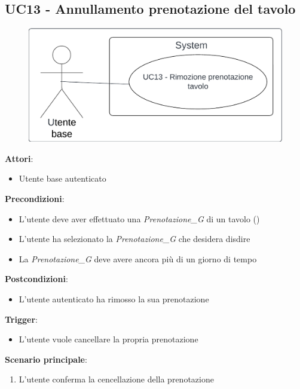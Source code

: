 \subsection{UC13 - Annullamento prenotazione del tavolo} \label{usecase:13}
\begin{figure}[H]
\centering
\includegraphics[width=0.75\linewidth]{ucd/ucd13.png}
\end{figure}
\textbf{Attori}:
\begin{itemize}
    \item Utente base autenticato
\end{itemize}
\textbf{Precondizioni}:
\begin{itemize}
    \item L'utente deve aver effettuato una \textit{Prenotazione_G} di un tavolo ()
    \item L'utente ha selezionato la \textit{Prenotazione_G} che desidera disdire
    \item La \textit{Prenotazione_G} deve avere ancora più di un giorno di tempo
\end{itemize}
\textbf{Postcondizioni}:
\begin{itemize}
    \item L'utente autenticato ha rimosso la sua prenotazione
\end{itemize}
\textbf{Trigger}:
\begin{itemize}
    \item L'utente vuole cancellare la propria prenotazione
\end{itemize}
\textbf{Scenario principale}:
\begin{enumerate}
    \item L'utente conferma la cencellazione della prenotazione
\end{enumerate}
\newpage